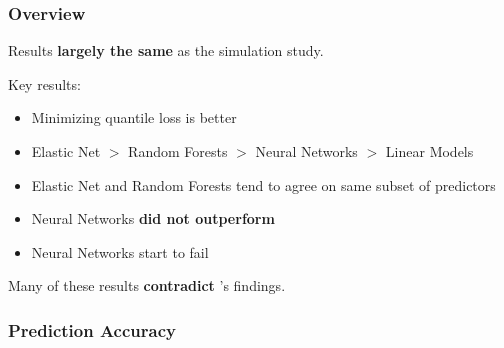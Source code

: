 \documentclass[aspectratio=169]{beamer}
\begin{document}
\begin{frame}
\frametitle{Overview}

Results \textbf{largely the same} as the simulation study.

Key results:
\begin{itemize}
	\item Minimizing quantile loss is better
	\item Elastic Net $>$ Random Forests $>$ Neural Networks $>$ Linear Models
	\item Elastic Net and Random Forests tend to agree on same subset of predictors
	\item Neural Networks \textbf{did not outperform}
	\item Neural Networks start to fail
\end{itemize}

Many of these results \textbf{contradict} \cite{gu_empirical_2018}'s findings.

\end{frame}


\subsubsection{Prediction Accuracy}



\end{document}
